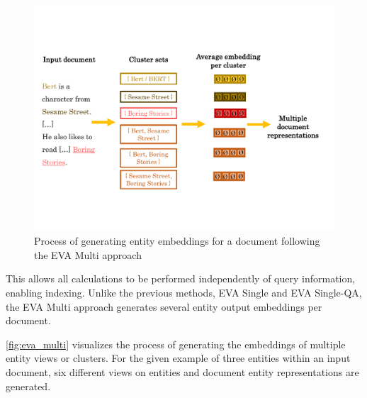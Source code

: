 \begin{figure}[!htb]
    \centering
    \includegraphics[trim={0cm 3cm 0cm 3.5cm}, clip, width=\textwidth]{resources/eva_multi} 
    \caption{Process of generating entity embeddings for a document following the EVA Multi approach}
    \label{fig:eva_multi}
\end{figure}

This allows all calculations to be performed independently of query information, enabling indexing. Unlike the previous methods, EVA Single and EVA Single-QA, the EVA Multi approach generates several entity output embeddings per document.

\autoref{fig:eva_multi} visualizes the process of generating the embeddings of multiple entity views or clusters. For the given example of three entities within an input document, six different views on entities and document entity representations are generated.


